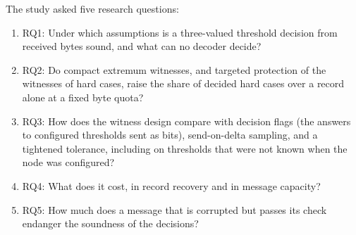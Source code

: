 The study asked five research questions:
\begin{enumerate}
  \item RQ1: Under which assumptions is a three-valued threshold decision from received bytes sound, and what can no decoder decide?
  \item RQ2: Do compact extremum witnesses, and targeted protection of the witnesses of hard cases, raise the share of decided hard cases over a record alone at a fixed byte quota?
  \item RQ3: How does the witness design compare with decision flags (the answers to configured thresholds sent as bits), send-on-delta sampling, and a tightened tolerance, including on thresholds that were not known when the node was configured?
  \item RQ4: What does it cost, in record recovery and in message capacity?
  \item RQ5: How much does a message that is corrupted but passes its check endanger the soundness of the decisions?
\end{enumerate}


